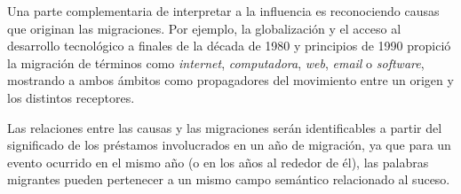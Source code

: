 

Una parte complementaria de interpretar a la influencia es reconociendo causas que originan las migraciones. Por ejemplo, la globalización y el acceso al desarrollo tecnológico a finales de la década de 1980 y principios de 1990 propició la migración  de términos como \textit{internet}, \textit{computadora}, \textit{web}, \textit{email} o \textit{software}, mostrando a ambos ámbitos como propagadores del movimiento entre un origen y los distintos receptores.

Las relaciones entre las causas y las migraciones serán identificables a partir  del significado de los préstamos involucrados en un año de migración,  ya que para un evento ocurrido en el mismo año (o en los años al rededor de él), las palabras migrantes pueden pertenecer a un mismo campo semántico relacionado al suceso.




















